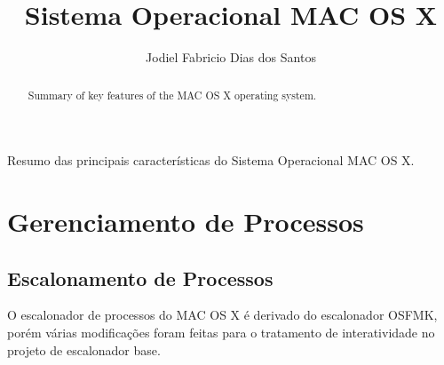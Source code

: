 \documentclass[12pt]{article}
\title{Sistema Operacional MAC OS X}
\author{Jodiel Fabricio Dias dos Santos\inst{1} }
\begin{document}
 

\maketitle

\begin{abstract}
  Summary of key features of the MAC OS X operating system.
\end{abstract}

\begin{resumo} 
  Resumo das principais características do Sistema Operacional MAC OS X.
\end{resumo}

\section{Gerenciamento de Processos}\label{sec:firstpage}
 
\subsection{Escalonamento de Processos}
O escalonador de processos do MAC OS X é derivado do escalonador OSFMK, porém várias modificações foram feitas para o tratamento de interatividade no projeto de escalonador base.
\end{document}
